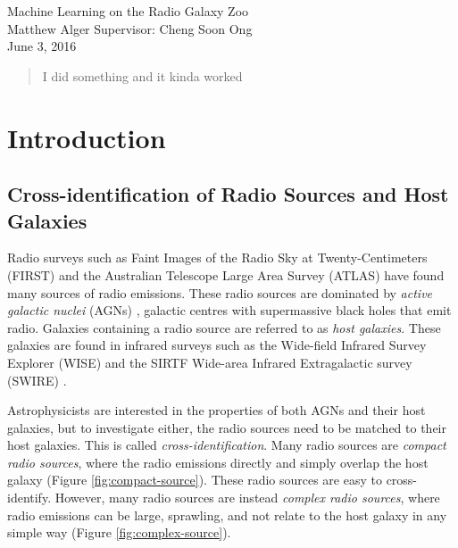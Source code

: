 \documentclass[a4paper]{article}
\newcommand{\fig}{Figure }
\begin{document}
  {\Large\noindent  Machine Learning on the Radio Galaxy Zoo}\\

  {\large\noindent  Matthew Alger \hfill Supervisor: Cheng Soon Ong}\\

  {\large\noindent  June 3, 2016}\\

  \begin{abstract}
    I did something and it kinda worked
  \end{abstract}

  \section{Introduction}

    \subsection{Cross-identification of Radio Sources and Host Galaxies}

      Radio surveys such as Faint Images of the Radio Sky at Twenty-Centimeters (FIRST) \cite{white97,becker95} and the Australian Telescope Large Area Survey (ATLAS) \cite{franzen15} have found many sources of radio emissions. These radio sources are dominated by \emph{active galactic nuclei} (AGNs) \cite{banfield15}, galactic centres with supermassive black holes that emit radio\cite{peterson97}. Galaxies containing a radio source are referred to as \emph{host galaxies}. These galaxies are found in infrared surveys such as the Wide-field Infrared Survey Explorer (WISE) \cite{wright10} and the SIRTF Wide-area Infrared Extragalactic survey (SWIRE) \cite{surace05,lonsdale03}.

      Astrophysicists are interested in the properties of both AGNs and their host galaxies, but to investigate either, the radio sources need to be matched to their host galaxies. This is called \emph{cross-identification}. Many radio sources are \emph{compact radio sources}, where the radio emissions directly and simply overlap the host galaxy (\fig \ref{fig:compact-source}). These radio sources are easy to cross-identify\cite{banfield15}. However, many radio sources are instead \emph{complex radio sources}, where radio emissions can be large, sprawling, and not relate to the host galaxy in any simple way (\fig \ref{fig:complex-source}).
\end{document}
